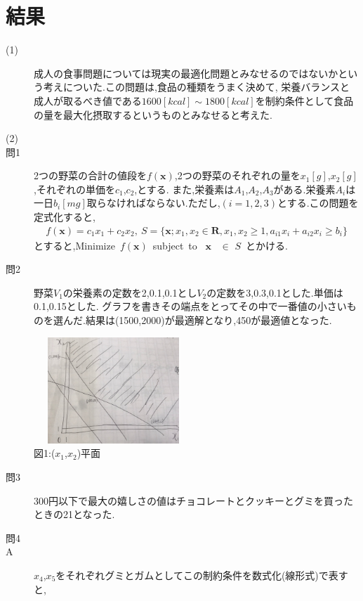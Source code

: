 \documentclass[12pt]{jarticle}
\begin{document}
\section{結果}
\begin{description}
	\item[(1)] 成人の食事問題については現実の最適化問題とみなせるのではないかという考えについた.この問題は,食品の種類をうまく決めて,
	      栄養バランスと成人が取るべき値である$1600[kcal]\sim 1800[kcal]$を制約条件として食品の量を最大化摂取するというものとみなせると考えた.
	\item[(2)]
	\item[問1]
	      2つの野菜の合計の値段を$f(\boldsymbol{x})$,2つの野菜のそれぞれの量を$x_1[g]$,$x_2[g]$,それぞれの単価を$c_1$,$c_2$,とする.
	      また,栄養素は$A_1$,$A_2$,$A_3$がある.栄養素$A_i$は一日$b_i[mg]$取らなければならない.ただし,$(i=1,2,3)$とする.この問題を定式化すると,
	      \begin{eqnarray}
		      f(\boldsymbol{x})=c_1 x_1 +c_2 x_2, \ S=\{\boldsymbol{x};x_1,x_2\in \boldsymbol{R},x_1,x_2\geq 1,a_{i1} x_i+a_{i2}x_i\geq b_i\}\nonumber
	      \end{eqnarray}
	      とすると,Minimize\ $f(\boldsymbol{x})$\ subject\ to \ $\boldsymbol{x}$ \ $\in$ $S$\ とかける.
	\item[問2] 野菜$V_1$の栄養素の定数を2,0.1,0.1とし$V_2$の定数を3,0.3,0.1とした.単価は0.1,0.15とした.
	      グラフを書きその端点をとってその中で一番値の小さいものを選んだ.結果は(1500,2000)が最適解となり,450が最適値となった.
	      \begin{center}
		      \includegraphics[height=4cm,width=6cm]{1.png}\\
		      図1:($x_1$,$x_2$)平面\\
	      \end{center}
	\item[問3]
	      300円以下で最大の嬉しさの値はチョコレートとクッキーとグミを買ったときの21となった. 
	\item[問4]
	\item[A]
	      $x_4$,$x_5$をそれぞれグミとガムとしてこの制約条件を数式化(線形式)で表すと,
	      \begin{eqnarray}

\end{eqnarray}
\end{description}
\end{document}
